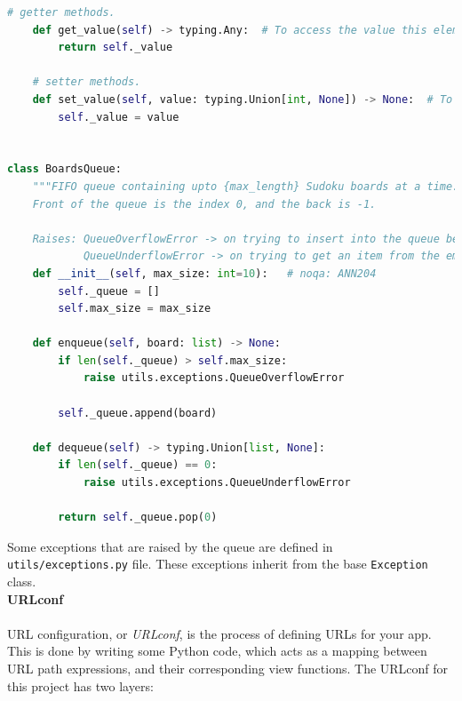 \documentclass[12pt, a4paper]{report}
\newcommand{\code}[1]{\colorbox{light-gray}{\texttt{#1}}}
\begin{document}
\begin{lstlisting}[language=Python, caption=utils/classes.py]
    # getter methods.
    def get_value(self) -> typing.Any:  # To access the value this element has.
        return self._value

    # setter methods.
    def set_value(self, value: typing.Union[int, None]) -> None:  # To access the value this element will have.
        self._value = value


class BoardsQueue:
    """FIFO queue containing upto {max_length} Sudoku boards at a time.
    Front of the queue is the index 0, and the back is -1.
    
    Raises: QueueOverflowError -> on trying to insert into the queue beyond it's specified max_size
            QueueUnderflowError -> on trying to get an item from the empty queue."""
    def __init__(self, max_size: int=10):   # noqa: ANN204
        self._queue = []
        self.max_size = max_size

    def enqueue(self, board: list) -> None:
        if len(self._queue) > self.max_size:
            raise utils.exceptions.QueueOverflowError
        
        self._queue.append(board)

    def dequeue(self) -> typing.Union[list, None]:
        if len(self._queue) == 0:
            raise utils.exceptions.QueueUnderflowError
        
        return self._queue.pop(0)
    \end{lstlisting}
    Some exceptions that are raised by the queue are defined in \texttt{utils/exceptions.py} file. These exceptions inherit from the base \code{Exception} class.\\
    \newline
    \textbf{URLconf}\\\\
    URL configuration, or \textit{URLconf}, is the process of defining URLs for your app. This is done by writing some Python code, which acts as a mapping between URL path expressions, and their corresponding view functions.
    The URLconf for this project has two layers:
\end{document}
